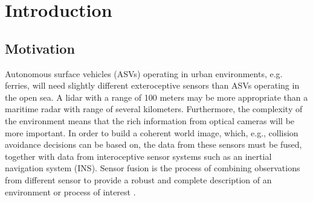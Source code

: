 
\chapter{Introduction}

\section{Motivation}
Autonomous surface vehicles (ASVs) operating in urban environments, e.g. ferries, will need slightly different exteroceptive sensors than ASVs operating in the open sea. A lidar with a range of 100 meters may be more appropriate than a maritime radar with range of several kilometers. Furthermore, the complexity of the environment means that the rich information from optical cameras will be more important. In order to build a coherent world image, which, e.g., collision avoidance decisions can be based on, the data from these sensors must be fused, together with data from interoceptive sensor systems such as an inertial navigation system (INS). Sensor fusion is the process of combining observations from different sensor to provide a robust and complete description of an environment or process of interest \cite{Siciliano:2007:SHR:1209344}.
